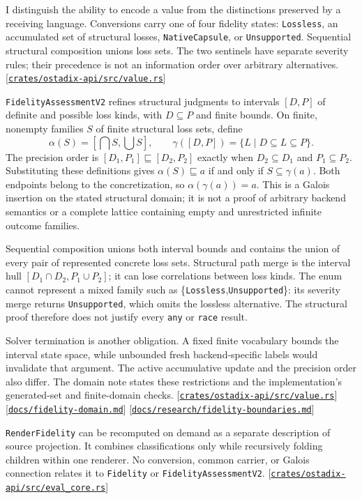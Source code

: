 \documentclass[11pt,oneside]{article}
\newcommand{\src}[1]{\textcolor{OSlate}{\scriptsize[\href{https://github.com/lostadi/OSTADIX/blob/c0b02c326b2329a95ba52447c7180bc93957cd57/#1}{\nolinkurl{#1}}]}\allowbreak}
\begin{document}
I distinguish the ability to encode a value from the distinctions preserved
by a receiving language. Conversions carry one of four fidelity states:
\texttt{Lossless}, an accumulated set of structural losses,
\texttt{NativeCapsule}, or \texttt{Unsupported}. Sequential structural
composition unions loss sets. The two sentinels have separate severity rules;
their precedence is not an information order over arbitrary alternatives.
\src{crates/ostadix-api/src/value.rs}

\texttt{FidelityAssessmentV2} refines structural judgments to intervals
$[D,P]$ of definite and possible loss kinds, with $D \subseteq P$ and finite
bounds. On finite, nonempty families $S$ of finite structural loss sets,
define
\[
  \alpha(S)=[\bigcap S,\bigcup S],\qquad
  \gamma([D,P])=\{L\mid D\subseteq L\subseteq P\}.
\]
The precision order is
$[D_1,P_1]\sqsubseteq[D_2,P_2]$ exactly when
$D_2\subseteq D_1$ and $P_1\subseteq P_2$. Substituting these definitions gives
$\alpha(S)\sqsubseteq a$ if and only if $S\subseteq\gamma(a)$.
Both endpoints belong to the concretization, so $\alpha(\gamma(a))=a$.
This is a Galois insertion on the stated structural domain; it is not a
proof of arbitrary backend semantics or a complete lattice containing
empty and unrestricted infinite outcome families.

Sequential composition unions both interval bounds and contains the union
of every pair of represented concrete loss sets. Structural path merge is
the interval hull $[D_1\cap D_2,P_1\cup P_2]$; it can lose correlations
between loss kinds. The enum cannot represent a mixed family such as
\{\texttt{Lossless},\texttt{Unsupported}\}: its severity merge returns
\texttt{Unsupported}, which omits the lossless alternative. The structural
proof therefore does not justify every \texttt{any} or \texttt{race} result.

Solver termination is another obligation. A fixed finite vocabulary bounds
the interval state space, while unbounded fresh backend-specific labels
would invalidate that argument. The active accumulative update and the
precision order also differ. The domain note states these restrictions and
the implementation's generated-set and finite-domain checks.
\src{crates/ostadix-api/src/value.rs}
\src{docs/fidelity-domain.md}
\src{docs/research/fidelity-boundaries.md}

\texttt{RenderFidelity} can be recomputed on demand as a separate description
of source projection. It combines classifications only while recursively
folding children within one renderer. No conversion, common carrier, or Galois
connection relates it to \texttt{Fidelity} or \texttt{FidelityAssessmentV2}.
\src{crates/ostadix-api/src/eval_core.rs}
\end{document}

